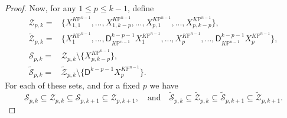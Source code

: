 \documentclass[12pt]{amsart}
\numberwithin{equation}{section}
\newcommand{\KP}{K\mathbb{P}}
\begin{document}
\begin{proof}
Now, for any $1\leq{p}\leq{k-1}$, define
\begin{align*}
\mathcal{Z}_{p,k}=&\{X^{\KP^{n-1}}_{1,1},...,X^{\KP^{n-1}}_{1,k-p},...,X^{\KP^{n-1}}_{p,1},...,X^{\KP^{n-1}}_{p,k-p}\},\\
\widetilde{\mathcal{Z}}_{p,k}=&\{X^{\KP^{n-1}}_1,...,\mathsf{D}_{\KP^{n-1}}^{k-p-1}X^{\KP^{n-1}}_1,...,X^{\KP^{n-1}}_p,...,\mathsf{D}_{\KP^{n-1}}^{k-p-1}X^{\KP^{n-1}}_p\},\\
\mathcal{S}_{p,k}=&\mathcal{Z}_{p,k}\setminus\{X^{\KP^{n-1}}_{p,k-p}\},\\
\widetilde{\mathcal{S}}_{p,k}=&\widetilde{\mathcal{Z}}_{p,k}\setminus\{\mathsf{D}^{k-p-1}X^{\KP^{n-1}}_p\}.
\end{align*}
For each of these sets, and for a fixed $p$ we have
\begin{equation}\label{eqn:set_inclusions_for_ZpkSpk}
\mathcal{S}_{p,k}\subseteq\mathcal{Z}_{p,k}\subseteq\mathcal{S}_{p,k+1}\subseteq\mathcal{Z}_{p,k+1},\quad\text{and}\quad\widetilde{\mathcal{S}}_{p,k}\subseteq\widetilde{\mathcal{Z}}_{p,k}\subseteq\widetilde{\mathcal{S}}_{p,k+1}\subseteq\widetilde{\mathcal{Z}}_{p,k+1}.
\end{equation}


\end{proof}
\end{document}
